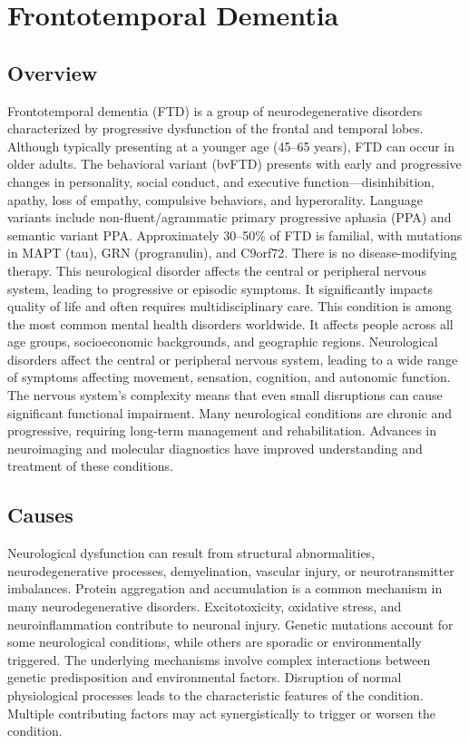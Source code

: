 \chapter{Frontotemporal Dementia}
\label{sec:geriatric:Frontotemporal Dementia}

\section{Overview}
Frontotemporal dementia (FTD) is a group of neurodegenerative disorders characterized by progressive dysfunction of the frontal and temporal lobes. Although typically presenting at a younger age (45--65 years), FTD can occur in older adults. The behavioral variant (bvFTD) presents with early and progressive changes in personality, social conduct, and executive function---disinhibition, apathy, loss of empathy, compulsive behaviors, and hyperorality. Language variants include non-fluent/agrammatic primary progressive aphasia (PPA) and semantic variant PPA. Approximately 30--50\% of FTD is familial, with mutations in MAPT (tau), GRN (progranulin), and C9orf72. There is no disease-modifying therapy. This neurological disorder affects the central or peripheral nervous system, leading to progressive or episodic symptoms. It significantly impacts quality of life and often requires multidisciplinary care. This condition is among the most common mental health disorders worldwide. It affects people across all age groups, socioeconomic backgrounds, and geographic regions. Neurological disorders affect the central or peripheral nervous system, leading to a wide range of symptoms affecting movement, sensation, cognition, and autonomic function. The nervous system's complexity means that even small disruptions can cause significant functional impairment. Many neurological conditions are chronic and progressive, requiring long-term management and rehabilitation. Advances in neuroimaging and molecular diagnostics have improved understanding and treatment of these conditions.
\section{Causes}
Neurological dysfunction can result from structural abnormalities, neurodegenerative processes, demyelination, vascular injury, or neurotransmitter imbalances. Protein aggregation and accumulation is a common mechanism in many neurodegenerative disorders. Excitotoxicity, oxidative stress, and neuroinflammation contribute to neuronal injury. Genetic mutations account for some neurological conditions, while others are sporadic or environmentally triggered. The underlying mechanisms involve complex interactions between genetic predisposition and environmental factors. Disruption of normal physiological processes leads to the characteristic features of the condition. Multiple contributing factors may act synergistically to trigger or worsen the condition.
